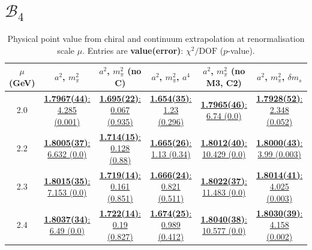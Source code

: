 \documentclass[12pt]{extarticle}
\begin{document}
\section{$\mathcal{B}_4$}
\begin{table}[h!]
\begin{center}
\begin{tabular}{|c|c|c|c|c|c|}
\hline
$\mu$ (GeV) & $a^2$, $m_\pi^2$& $a^2$, $m_\pi^2$ (no C)& $a^2$, $m_\pi^2$, $a^4$& $a^2$, $m_\pi^2$ (no M3, C2)& $a^2$, $m_\pi^2$, $\delta m_s$\\
\hline
2.0& \hyperlink{SSpPP/SUSY/bag_a2m2_20.pdf.1}{\textbf{1.7967(44)}: 4.285 (0.001)} & \hyperlink{SSpPP/SUSY/bag_a2m2noC_20.pdf.1}{\textbf{1.695(22)}: 0.067 (0.935)} & \hyperlink{SSpPP/SUSY/bag_a2a4m2_20.pdf.1}{\textbf{1.654(35)}: 1.23 (0.296)} & \hyperlink{SSpPP/SUSY/bag_a2m2mcut_20.pdf.1}{\textbf{1.7965(46)}: 6.74 (0.0)} & \hyperlink{SSpPP/SUSY/bag_a2m2delm_20.pdf.1}{\textbf{1.7928(52)}: 2.348 (0.052)}\\
2.2& \hyperlink{SSpPP/SUSY/bag_a2m2_22.pdf.1}{\textbf{1.8005(37)}: 6.632 (0.0)} & \hyperlink{SSpPP/SUSY/bag_a2m2noC_22.pdf.1}{\textbf{1.714(15)}: 0.128 (0.88)} & \hyperlink{SSpPP/SUSY/bag_a2a4m2_22.pdf.1}{\textbf{1.665(26)}: 1.13 (0.34)} & \hyperlink{SSpPP/SUSY/bag_a2m2mcut_22.pdf.1}{\textbf{1.8012(40)}: 10.429 (0.0)} & \hyperlink{SSpPP/SUSY/bag_a2m2delm_22.pdf.1}{\textbf{1.8000(43)}: 3.99 (0.003)}\\
2.3& \hyperlink{SSpPP/SUSY/bag_a2m2_23.pdf.1}{\textbf{1.8015(35)}: 7.153 (0.0)} & \hyperlink{SSpPP/SUSY/bag_a2m2noC_23.pdf.1}{\textbf{1.719(14)}: 0.161 (0.851)} & \hyperlink{SSpPP/SUSY/bag_a2a4m2_23.pdf.1}{\textbf{1.666(24)}: 0.821 (0.511)} & \hyperlink{SSpPP/SUSY/bag_a2m2mcut_23.pdf.1}{\textbf{1.8022(37)}: 11.483 (0.0)} & \hyperlink{SSpPP/SUSY/bag_a2m2delm_23.pdf.1}{\textbf{1.8014(41)}: 4.025 (0.003)}\\
2.4& \hyperlink{SSpPP/SUSY/bag_a2m2_24.pdf.1}{\textbf{1.8037(34)}: 6.49 (0.0)} & \hyperlink{SSpPP/SUSY/bag_a2m2noC_24.pdf.1}{\textbf{1.722(14)}: 0.19 (0.827)} & \hyperlink{SSpPP/SUSY/bag_a2a4m2_24.pdf.1}{\textbf{1.674(25)}: 0.989 (0.412)} & \hyperlink{SSpPP/SUSY/bag_a2m2mcut_24.pdf.1}{\textbf{1.8040(38)}: 10.577 (0.0)} & \hyperlink{SSpPP/SUSY/bag_a2m2delm_24.pdf.1}{\textbf{1.8030(39)}: 4.158 (0.002)}\\
\hline
\end{tabular}
\caption{Physical point value from chiral and continuum extrapolation at renormalisation scale $\mu$. Entries are \textbf{value(error)}: $\chi^2/\text{DOF}$ ($p$-value).}
\end{center}
\end{table}
\end{document}

